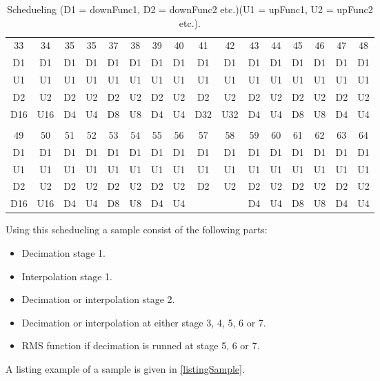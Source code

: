 \begin{table}[H]
\begin{tabular}{|c|c|c|c|c|c|c|c|c|c|c|c|c|c|c|c|}
\rowcolor[HTML]{C0C0C0} 
\multicolumn{16}{|c|}{\cellcolor[HTML]{C0C0C0}Sample}                             \\ \hline
\rowcolor[HTML]{C0C0C0} 
33  & 34  & 35 & 35 & 37 & 38 & 39 & 40 & 41  & 42  & 43 & 44 & 45 & 46 & 47 & 48 \\ \hline
D1  & D1  & D1 & D1 & D1 & D1 & D1 & D1 & D1  & D1  & D1 & D1 & D1 & D1 & D1 & D1 \\ \hline
U1  & U1  & U1 & U1 & U1 & U1 & U1 & U1 & U1  & U1  & U1 & U1 & U1 & U1 & U1 & U1 \\ \hline
D2  & U2  & D2 & U2 & D2 & U2 & D2 & U2 & D2  & U2  & D2 & U2 & D2 & U2 & D2 & U2 \\ \hline
D16 & U16 & D4 & U4 & D8 & U8 & D4 & U4 & D32 & U32 & D4 & U4 & D8 & U8 & D4 & U4 \\ \hline
\rowcolor[HTML]{C0C0C0} 
\multicolumn{16}{|c|}{\cellcolor[HTML]{C0C0C0}Sample}                             \\ \hline
\rowcolor[HTML]{C0C0C0} 
49  & 50  & 51 & 52 & 53 & 54 & 55 & 56 & 57  & 58  & 59 & 60 & 61 & 62 & 63 & 64 \\ \hline
D1  & D1  & D1 & D1 & D1 & D1 & D1 & D1 & D1  & D1  & D1 & D1 & D1 & D1 & D1 & D1 \\ \hline
U1  & U1  & U1 & U1 & U1 & U1 & U1 & U1 & U1  & U1  & U1 & U1 & U1 & U1 & U1 & U1 \\ \hline
D2  & U2  & D2 & U2 & D2 & U2 & D2 & U2 & D2  & U2  & D2 & U2 & D2 & U2 & D2 & U2 \\ \hline
D16 & U16 & D4 & U4 & D8 & U8 & D4 & U4 &     &     & D4 & U4 & D8 & U8 & D4 & U4 \\ \hline
\end{tabular}
\caption{Schedueling (D1 = downFunc1, D2 = downFunc2 etc.)(U1 = upFunc1, U2 = upFunc2 etc.).}
\label{tb:schedueling}
\end{table}


Using this schedueling a sample consist of the following parts:
\begin{itemize}
\item Decimation stage 1.
\item Interpolation stage 1.
\item Decimation or interpolation stage 2.
\item Decimation or interpolation at either stage 3, 4, 5, 6 or 7. 
\item RMS function if decimation is runned at stage 5, 6 or 7.
\end{itemize}

A listing example of a sample is given in \autoref{listingSample}. 

